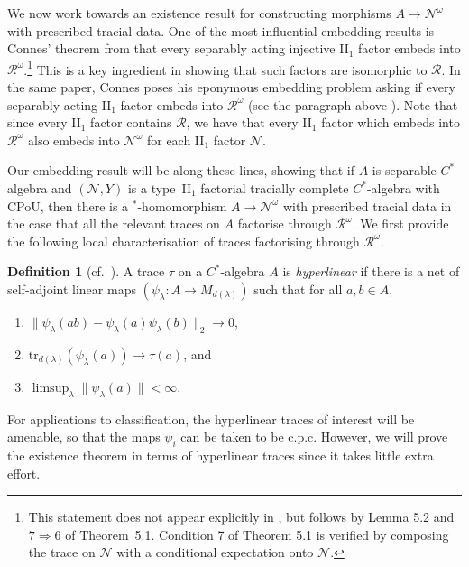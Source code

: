 \documentclass[a4paper,11pt]{amsart}
\theoremstyle{definition}
\newtheorem{definition}[theorem]{Definition}
\numberwithin{equation}{section}
\numberwithin{theorem}{section}
\begin{document}
We now work towards an existence result for constructing morphisms $A \rightarrow \mathcal N^\omega$ with prescribed tracial data.  One of the most influential embedding results is Connes' theorem from \cite{Co76} that every separably acting injective II$_1$ factor embeds into $\mathcal R^\omega$.\footnote{This statement does not appear explicitly in \cite{Co76}, but follows by Lemma 5.2 and $7 \Rightarrow 6$ of Theorem~5.1. Condition 7 of Theorem 5.1 is verified by composing the trace on $\mathcal N$ with a conditional expectation onto $\mathcal N$.}  This is a key ingredient in showing that such factors are isomorphic to $\mathcal R$.  In the same paper, Connes poses his eponymous embedding problem asking if every separably acting II$_1$ factor embeds into $\mathcal R^\omega$ (see the paragraph above \cite[Notation~5.6]{Co76}).  Note that since every II$_1$ factor contains $\mathcal R$, we have that every II$_1$ factor which embeds into $\mathcal R^\omega$ also embeds into $\mathcal N^\omega$ for each II$_1$ factor $\mathcal N$.  

Our embedding result will be along these lines, showing that if $A$ is separable $C^*$-algebra and $(\mathcal N, Y)$ is a type~{\rm II}$_1$ factorial tracially complete $C^*$-algebra with CPoU, then there is a $^*$-homomorphism $A \rightarrow \mathcal N^\omega$ with prescribed tracial data in the case that all the relevant traces on $A$ factorise through $\mathcal R^\omega$.  We first provide the following local characterisation of traces factorising through $\mathcal R^\omega$.

\begin{definition}[{cf.\ \cite[Remark~3.7]{BS16}}]\label{defn:hyperlinear}
	A trace $\tau$ on a $C^*$-algebra $A$ is \emph{hyperlinear} if there is a net of self-adjoint linear maps $(\psi_\lambda \colon A \rightarrow M_{d(\lambda)})$ such that for all $a, b \in A$,
	\begin{enumerate}
		\item $\|\psi_\lambda(ab) - \psi_\lambda(a) \psi_\lambda(b) \|_2 \rightarrow 0$,\label{defn:hyperlinear-mult}
		\item 
		$\mathrm{tr}_{d(\lambda)}(\psi_\lambda(a))\rightarrow \tau(a)$, and\label{defn:hyperlinear-tracial}
		\item\label{hyp-bdd} $\displaystyle \limsup_\lambda \|\psi_\lambda(a)\| < \infty$.\label{defn:hyperlinear-bdd}
	\end{enumerate}
\end{definition}

For applications to classification, the hyperlinear traces of interest will be amenable, so that the maps $\psi_i$ can be taken to be c.p.c.  However, we will prove the existence theorem in terms of hyperlinear traces since it takes little extra effort.
\end{document}
